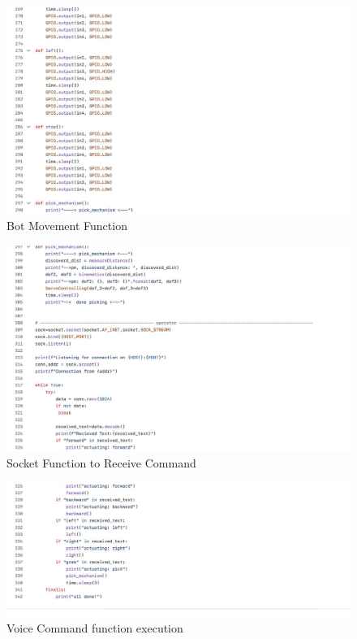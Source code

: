 \begin{figure}[h]
    \centering
    \includegraphics[width=1\linewidth]{Graphics/10 FunctionForBotMotion.jpg}
    \caption{Bot Movement Function}
    \label{fig:enter-label}
\end{figure}
\begin{figure}[h]
    \centering
    \includegraphics[width=1\linewidth]{Graphics/11functiontoPickAnd socket.jpg}
    \caption{Socket Function to Receive Command}
    \label{fig:enter-label}
\end{figure}
\begin{figure}[h]
    \centering
    \includegraphics[width=1\linewidth]{Graphics/12voiceCommand.jpg}
    \caption{Voice Command function execution}
    \label{fig:enter-label}
\end{figure}

